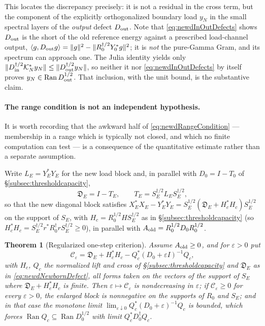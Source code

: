 \documentclass[11pt]{amsart}
\newtheorem{theorem}{Theorem}[section]
\theoremstyle{definition}
\theoremstyle{remark}
\begin{document}
This locates the discrepancy precisely: it is not a residual in the cross
term, but the component of the explicitly orthogonalized boundary load
\(y_N\) in the small spectral layers of the \emph{output} defect
\(D_{\rm out}\).  Note that \eqref{eq:newdInOutDefects} shows
\(D_{\rm out}\) is the short of the old reference energy against a prescribed
load-channel output, \(\langle g,D_{\rm out}g\rangle
 =\|g\|^2-\|R_0^{\dagger/2}Y_0^*g\|^2\); it is \emph{not} the pure-Gamma
Gram, and its spectrum can approach one.  The Julia identity yields only
\(\|D_{\rm in}^{\dagger/2}\mathcal K_N^*y_N\|
 \le\|D_{\rm out}^{\dagger/2}y_N\|\), so neither it nor
\eqref{eq:newdInOutDefects} by itself proves
\(y_N\in\operatorname{Ran}D_{\rm out}^{1/2}\).  That inclusion, with the unit
bound, is the substantive claim.

\paragraph{The range condition is not an independent hypothesis.}
It is worth recording that the awkward half of
\eqref{eq:newdRangeCondition} --- membership in a range which is typically
not closed, and which no finite computation can test --- is a consequence of
the quantitative estimate rather than a separate assumption.

Write \(L_E=Y_E^*Y_E\) for the new load block and, in parallel with
\(D_0=I-T_0\) of \S\ref{subsec:thresholdcapacity},
\begin{equation}\label{eq:newdNewbornDefect}
 \mathfrak D_E=I-T_E,
 \qquad
 T_E=S_E^{\dagger/2}L_ES_E^{\dagger/2},
\end{equation}
so that the new diagonal block satisfies
\(X_E^*X_E-Y_E^*Y_E=S_E^{1/2}(\mathfrak D_E+H_c^*H_c)S_E^{1/2}\) on the
support of \(S_E\), with \(H_c=R_0^{1/2}HS_E^{\dagger/2}\) as in
\S\ref{subsec:thresholdcapacity} (so
\(H_c^*H_c=S_E^{\dagger/2}r^*R_0^\dagger rS_E^{\dagger/2}\ge0\)), in parallel
with \(A_{\rm old}=R_0^{1/2}D_0R_0^{1/2}\).

\begin{theorem}[Regularized one-step criterion]\label{thm:newdRegularizedStep}
Assume \(A_{\rm old}\ge0\), and for \(\varepsilon>0\) put
\[
 \mathcal C_\varepsilon
 =\mathfrak D_E+H_c^*H_c-Q_c^*(D_0+\varepsilon I)^{-1}Q_c ,
\]
with \(H_c\), \(Q_c\) the normalized lift and cross of
\S\ref{subsec:thresholdcapacity} and \(\mathfrak D_E\) as in
\eqref{eq:newdNewbornDefect}, all forms taken on the vectors of the support
of \(S_E\) where \(\mathfrak D_E+H_c^*H_c\) is finite.
Then \(\varepsilon\mapsto\mathcal C_\varepsilon\) is nondecreasing in
\(\varepsilon\); if \(\mathcal C_\varepsilon\ge0\) for every
\(\varepsilon>0\), the enlarged block is nonnegative on the supports of
\(R_0\) and \(S_E\); and in that case
the monotone limit \(\lim_{\varepsilon\downarrow0}
Q_c^*(D_0+\varepsilon)^{-1}Q_c\) is bounded, which \emph{forces}
\(\operatorname{Ran}Q_c\subseteq\operatorname{Ran}D_0^{1/2}\) with limit
\(Q_c^*D_0^\dagger Q_c\).
\end{theorem}
\end{document}
